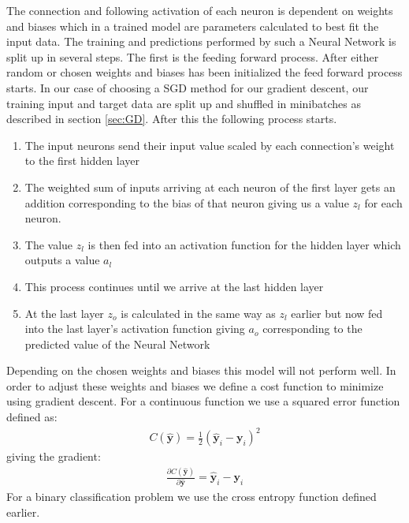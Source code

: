 \documentclass[11pt]{article}
\begin{document}
The connection and following activation of each neuron is dependent on weights and biases which in a trained model are parameters calculated to best fit the input data. The training and predictions performed by such a Neural Network is split up in several steps. The first is the feeding forward process. After either random or chosen weights and biases has been initialized the feed forward process starts. In our case of choosing a SGD method for our gradient descent, our training input and target data are split up and shuffled in minibatches as described in section \ref{sec:GD}. After this the following process starts.
\begin{enumerate}
    \item The input neurons send their input value scaled by each connection's weight to the first hidden layer
    \item The weighted sum of inputs arriving at each neuron of the first layer gets an addition corresponding to the bias of that neuron giving us a value $z_l$ for each neuron.
    \item The value $z_l$ is then fed into an activation function for the hidden layer which outputs a value $a_l$
    \item This process continues until we arrive at the last hidden layer
    \item At the last layer $z_o$ is calculated in the same way as $z_l$ earlier but now fed into the last layer's activation function giving $a_o$ corresponding to the predicted value of the Neural Network
\end{enumerate}
Depending on the chosen weights and biases this model will not perform well. In order to adjust these weights and biases we define a cost function to minimize using gradient descent. For a continuous function we use a squared error function defined as:
\begin{align*}
    C(\hat{\boldsymbol{y}}) = \frac{1}{2}(\hat{\boldsymbol{y}}_i - \boldsymbol{y}_i)^2
\end{align*}
giving the gradient:
\begin{align*}
    \frac{\partial C(\hat{\boldsymbol{y}})}{\partial  \hat{\boldsymbol{y}}} = \hat{\boldsymbol{y}}_i - \boldsymbol{y}_i
\end{align*}
For a binary classification problem we use the cross entropy function defined earlier.
\end{document}
